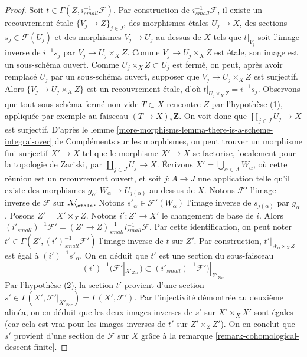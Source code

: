 \begin{proof}
\medskip\noindent
Soit $t \in \Gamma(Z, i^{-1}_{small}\mathcal{F})$. Par construction de
$i^{-1}_{small}\mathcal{F}$, il existe un recouvrement étale
$\{V_j \to Z\}_{j \in J}$, des morphismes étales $U_j \to X$, des sections
$s_j \in \mathcal{F}(U_j)$ et des morphismes $V_j \to U_j$ au-dessus de $X$
tels que $t|_{V_j}$ soit l'image inverse de $i^{-1}s_j$ par
$V_j \to U_j \times_X Z$. Comme $V_j \to U_j \times_X Z$ est étale,
son image est un sous-schéma ouvert. Comme $U_j \times_X Z \subset U_j$ est
fermé, on peut, après avoir remplacé $U_j$ par un sous-schéma ouvert, supposer
que $V_j \to U_j \times_X Z$ est surjectif. Alors $\{V_j \to U_j \times_X Z\}$
est un recouvrement étale, d'où $t|_{U_j \times_X Z} = i^{-1}s_j$.
Observons que tout sous-schéma fermé non vide $T \subset X$ rencontre $Z$
par l'hypothèse (1), appliquée par exemple au faisceau $(T \to X)_*\underline{\mathbf{Z}}$.
On voit donc que $\coprod_{j \in J} U_j \to X$ est surjectif.
D'après le lemme
\ref{more-morphisms-lemma-there-is-a-scheme-integral-over} de Compléments sur les morphismes,
on peut trouver un morphisme fini surjectif $X' \to X$
tel que le morphisme $X' \to X$ se factorise, localement pour la topologie de Zariski, par $\coprod_{j \in J} U_j \to X$.
Écrivons $X' = \bigcup_{\alpha \in A} W_\alpha$, où cette réunion est un recouvrement ouvert,
et soit $j : A \to J$ une application telle qu'il existe des morphismes
$g_\alpha : W_\alpha \to U_{j(\alpha)}$ au-dessus de $X$. Notons
$\mathcal{F}'$ l'image inverse de $\mathcal{F}$ sur $X'_\etale$.
Notons $s'_\alpha \in \mathcal{F}'(W_\alpha)$ l'image inverse
de $s_{j(\alpha)}$ par $g_\alpha$.
Posons $Z' = X' \times_X Z$. Notons $i' : Z' \to X'$
le changement de base de $i$. Alors $(i'_{small})^{-1}\mathcal{F}' =
(Z' \to Z)_{small}^{-1}i_{small}^{-1}\mathcal{F}$. Par cette identification,
on peut noter $t' \in
\Gamma(Z', (i')^{-1}_{small}\mathcal{F}')$
l'image inverse de $t$ sur $Z'$.
Par construction, $t'|_{W_\alpha \times_X Z}$ est égal à $(i')^{-1}s'_\alpha$.
On en déduit que $t'$ est une section du
sous-faisceau
$$
(i')^{-1}(\mathcal{F}'|_{X'_{Zar}})
\subset
(i'_{small})^{-1}\mathcal{F}')|_{Z'_{Zar}}
$$
Par l'hypothèse (2), la section $t'$ provient d'une section
$s' \in \Gamma(X', \mathcal{F}'|_{X'_{Zar}}) = \Gamma(X', \mathcal{F}')$.
Par l'injectivité démontrée au deuxième alinéa,
on en déduit que les deux images inverses de $s'$ sur
$X' \times_X X'$ sont égales (car cela est vrai pour
les images inverses de $t'$ sur $Z' \times_Z Z'$). On en conclut que
$s'$ provient d'une section de $\mathcal{F}$ sur $X$ grâce à la
remarque \ref{remark-cohomological-descent-finite}.
\end{proof}

